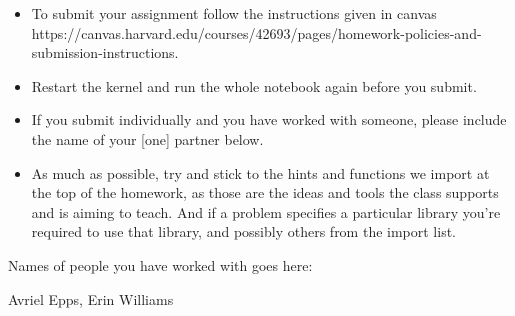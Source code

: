 \documentclass[11pt]{article}
\providecommand{\tightlist}{%
      \setlength{\itemsep}{0pt}\setlength{\parskip}{0pt}}
\begin{document}
\begin{itemize}
\tightlist
\item
  To submit your assignment follow the instructions given in canvas
  https://canvas.harvard.edu/courses/42693/pages/homework-policies-and-submission-instructions.
\item
  Restart the kernel and run the whole notebook again before you submit.
\item
  If you submit individually and you have worked with someone, please
  include the name of your {[}one{]} partner below.
\item
  As much as possible, try and stick to the hints and functions we
  import at the top of the homework, as those are the ideas and tools
  the class supports and is aiming to teach. And if a problem specifies
  a particular library you're required to use that library, and possibly
  others from the import list.
\end{itemize}

    Names of people you have worked with goes here:

    Avriel Epps, Erin Williams
\end{document}
